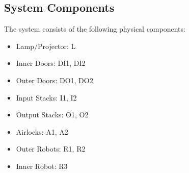 \documentclass[a4paper,12pt]{article}
\begin{document}
\subsection{System Components}
The system consists of the following physical components:
\begin{itemize}
\item Lamp/Projector: L
\item Inner Doors: DI1, DI2
\item Outer Doors: DO1, DO2
\item Input Stacks: I1, I2
\item Output Stacks: O1, O2
\item Airlocks: A1, A2
\item Outer Robots: R1, R2
\item Inner Robot: R3
\end{itemize}
\end{document}
